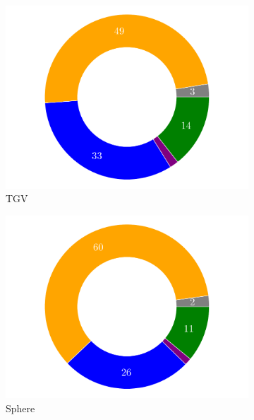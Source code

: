 \documentclass[10pt,a4paper]{article}
\begin{document}
\begin{figure}[!t]
  \centering
  \begin{subfigure}[t]{0.32\linewidth}
      \centering
      \includegraphics[width=\linewidth]{img/tgv_profile.pdf}
      \caption{TGV\hspace*{1em}}
  \end{subfigure}
  \begin{subfigure}[t]{0.32\linewidth}
    \centering\hspace*{-0.5cm}
    \includegraphics[width=\linewidth]{img/sphere_profile.pdf}
    \caption{Sphere\hspace*{2em}}
  \end{subfigure}
  \begin{subfigure}[t]{0.32\linewidth}

\end{subfigure}
\end{figure}
\end{document}
